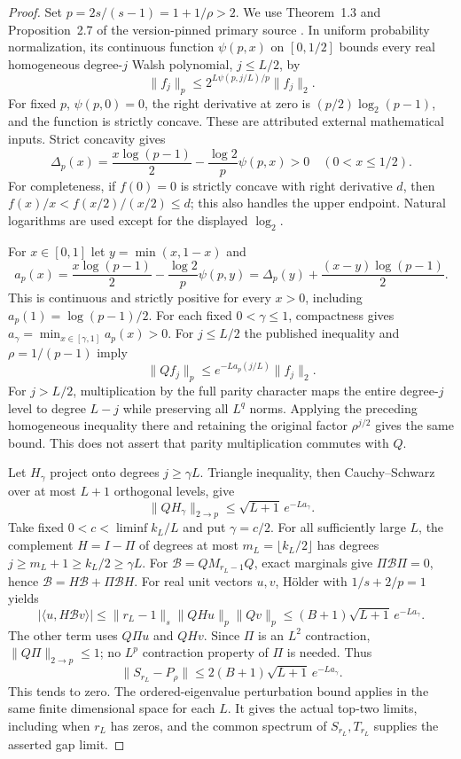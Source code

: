 \documentclass[11pt]{article}
\begin{document}
\begin{proof}
Set $p=2s/(s-1)=1+1/\rho>2$. We use Theorem~1.3 and
Proposition~2.7 of the version-pinned primary source
\cite{kirshner-samorodnitsky}. In uniform probability normalization, its
continuous function $\psi(p,x)$ on $[0,1/2]$ bounds every real homogeneous
degree-$j$ Walsh polynomial, $j\leq L/2$, by
\[
 \|f_j\|_p\leq2^{L\psi(p,j/L)/p}\|f_j\|_2.
\]
For fixed $p$, $\psi(p,0)=0$, the right derivative at zero is
$(p/2)\log_2(p-1)$, and the function is strictly concave.
These are attributed external mathematical inputs. Strict concavity gives
\[
 \Delta_p(x)=\frac{x\log(p-1)}2-
 \frac{\log2}{p}\psi(p,x)>0\quad(0<x\leq1/2).
\]
For completeness, if $f(0)=0$ is strictly concave with right derivative
$d$, then $f(x)/x<f(x/2)/(x/2)\leq d$; this also handles the upper
endpoint. Natural logarithms are used except for the displayed $\log_2$.

For $x\in[0,1]$ let $y=\min(x,1-x)$ and
\[
 a_p(x)=\frac{x\log(p-1)}2-\frac{\log2}{p}\psi(p,y)
 =\Delta_p(y)+\frac{(x-y)\log(p-1)}2.
\]
This is continuous and strictly positive for every $x>0$, including
$a_p(1)=\log(p-1)/2$. For each fixed $0<\gamma\leq1$, compactness gives
$a_\gamma=\min_{x\in[\gamma,1]}a_p(x)>0$.
For $j\leq L/2$ the published inequality and $\rho=1/(p-1)$ imply
\[
 \|Qf_j\|_p\leq e^{-La_p(j/L)}\|f_j\|_2.
\]
For $j>L/2$, multiplication by the full parity character maps the entire
degree-$j$ level to degree $L-j$ while preserving all $L^q$ norms.
Applying the preceding homogeneous inequality there and retaining the
original factor $\rho^{j/2}$ gives the same bound. This does not assert
that parity multiplication commutes with $Q$.

Let $H_\gamma$ project onto degrees $j\geq\gamma L$. Triangle inequality,
then Cauchy--Schwarz over at most $L+1$ orthogonal levels, give
\begin{equation}\label{eq:high-level-endpoint-322}
 \|QH_\gamma\|_{2\to p}\leq\sqrt{L+1}\,e^{-La_\gamma}.
\end{equation}
Take fixed $0<c<\liminf k_L/L$ and put $\gamma=c/2$. For all sufficiently
large $L$, the complement $H=I-\Pi$ of degrees at most
$m_L=\lfloor k_L/2\rfloor$ has degrees
$j\geq m_L+1\geq k_L/2\geq\gamma L$.
For $\mathcal B=QM_{r_L-1}Q$, exact marginals give $\Pi\mathcal B\Pi=0$,
hence $\mathcal B=H\mathcal B+\Pi\mathcal BH$.
For real unit vectors $u,v$, H\"older with $1/s+2/p=1$ yields
\[
 |\langle u,H\mathcal Bv\rangle|
 \leq\|r_L-1\|_s\|QHu\|_p\|Qv\|_p
 \leq(B+1)\sqrt{L+1}\,e^{-La_\gamma}.
\]
The other term uses $Q\Pi u$ and $QHv$. Since $\Pi$ is an $L^2$
contraction, $\|Q\Pi\|_{2\to p}\leq1$; no $L^p$ contraction property
of $\Pi$ is needed. Thus
\[
 \|S_{r_L}-P_\rho\|\leq2(B+1)\sqrt{L+1}\,e^{-La_\gamma}.
\]
This tends to zero. The ordered-eigenvalue perturbation bound applies in
the same finite dimensional space for each $L$. It gives the actual
top-two limits, including when $r_L$ has zeros, and the common spectrum
of $S_{r_L},T_{r_L}$ supplies the asserted gap limit.
\end{proof}
\end{document}
